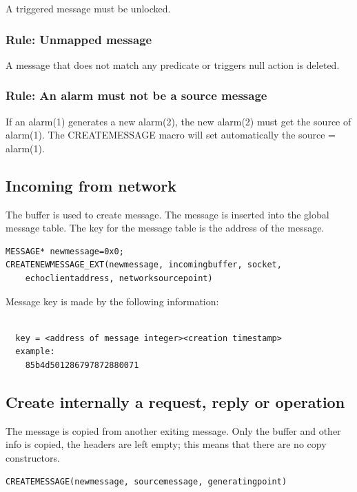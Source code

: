 \documentclass[a4paper]{report}
\begin{document}
 A triggered message must be unlocked.
 
\subsubsection{Rule: Unmapped message}
 
A message that does not match any predicate or triggers null action is deleted.
 
\subsubsection{Rule: An alarm must not be a source message}
If an alarm(1) generates a new alarm(2), the new alarm(2) must get the source of alarm(1).
The CREATEMESSAGE macro will set automatically the source = alarm(1).
 

\subsection{Incoming from network}

The buffer is used to create message. The message is inserted into the global message table. 
The key for the message table is the address of the message.

\begin{verbatim}
MESSAGE* newmessage=0x0;
CREATENEWMESSAGE_EXT(newmessage, incomingbuffer, socket,
    echoclientaddress, networksourcepoint)
\end{verbatim}

Message key is made by the following information:
\begin{verbatim}

  key = <address of message integer><creation timestamp>
  example:
    85b4d501286797872880071

\end{verbatim}
	
\subsection{Create internally a request, reply or operation}
	
The message is copied from another exiting message. Only the buffer and other info is copied, the headers are left empty; this means that there are no copy constructors.	
	
\begin{verbatim}
CREATEMESSAGE(newmessage, sourcemessage, generatingpoint)
\end{verbatim}
\end{document}
